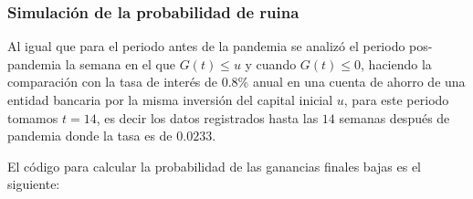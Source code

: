 \documentclass[
  us-letterpaper,
]{scrreprt}
\theoremstyle{plain}
\theoremstyle{plain}
\theoremstyle{definition}
\theoremstyle{remark}
\begin{document}
\subsubsection{Simulación de la probabilidad de
ruina}\label{simulaciuxf3n-de-la-probabilidad-de-ruina-1}

Al igual que para el periodo antes de la pandemia se analizó el periodo
pos-pandemia la semana en el que \(G(t)\leq u\) y cuando \(G(t)\leq0\),
haciendo la comparación con la tasa de interés de \(0.8\%\) anual en una
cuenta de ahorro de una entidad bancaria por la misma inversión del
capital inicial \(u\), para este periodo tomamos \(t = 14\), es decir
los datos registrados hasta las \(14\) semanas después de pandemia donde
la tasa es de \(0.0233.\)

El código para calcular la probabilidad de las ganancias finales bajas
es el siguiente:
\end{document}
